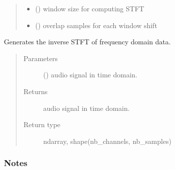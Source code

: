 \documentclass[letterpaper,10pt,english]{sphinxmanual}
\begin{document}
\begin{fulllineitems}
\begin{fulllineitems}
\begin{quote}
\begin{description}
\begin{itemize}
\item {} 
 () \textendash{} window size for computing STFT

\item {} 
 () \textendash{} overlap samples for each window shift

\end{itemize}

\end{description}\end{quote}

\end{fulllineitems}


\begin{fulllineitems}
\label{\detokenize{docs/source/preprocess:preprocess.preprocess_tools.STFT.istft}}
Generates the inverse STFT of frequency domain data.
\begin{quote}\begin{description}
\item[{Parameters}] \leavevmode
{} (\sphinxstyleliteralemphasis{\sphinxupquote{, }}\sphinxstyleliteralemphasis{\sphinxupquote{(}}\sphinxstyleliteralemphasis{\sphinxupquote{, }}\sphinxstyleliteralemphasis{\sphinxupquote{, }}\sphinxstyleliteralemphasis{\sphinxupquote{)}}) \textendash{} audio signal in time domain.

\item[{Returns}] \leavevmode
{} \textendash{} audio signal in time domain.

\item[{Return type}] \leavevmode
ndarray, shape(nb\_channels, nb\_samples)

\end{description}\end{quote}
\subsubsection*{Notes}


\end{fulllineitems}
\end{fulllineitems}
\end{document}
